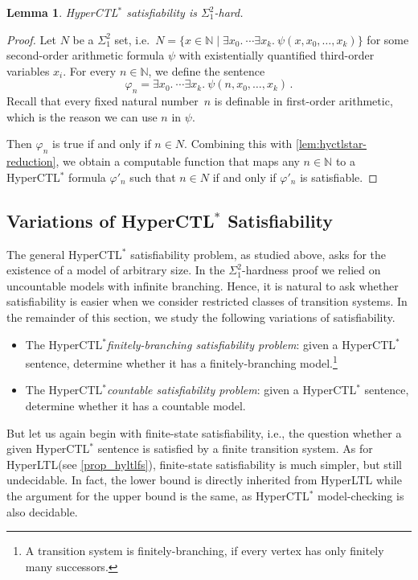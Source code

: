 \documentclass[dvipsnames,10pt,a4paper]{amsart}
\newtheorem{lem}[thm]{Lemma}
\theoremstyle{definition}
\theoremstyle{remark}
\newcommand{\set}[1]{\{#1\}}
\newcommand{\nats}{\mathbb{N}}
\renewcommand{\phi}{\varphi}
\newcommand\Nat{\nats}
\newcommand{\hyltl}{{HyperLTL}\xspace}
\newcommand{\hyctlstar}{{HyperCTL$^*$}\xspace}
\renewcommand{\phi}{\varphi}
\begin{document}
\begin{lem}
  \hyctlstar satisfiability is $\Sigma^2_1$-hard.
\end{lem}
\begin{proof}
  Let $N$ be a $\Sigma^2_1$ set, i.e.\
  $N = \set{x \in \nats \mid \exists x_0.\ \cdots \exists x_k.\ \psi(x, x_0, \ldots, x_k)}$ for some second-order arithmetic formula $\psi$ with existentially
  quantified third-order variables $x_i$.
  For every $n \in \Nat$, we define the sentence
  \[\varphi_n = \exists x_0.\ \cdots \exists x_k.\ \psi(n,x_0,\ldots,x_k)\, .\]
	Recall that every fixed natural number~$n$ is definable in first-order arithmetic, which is the reason we can use $n$ in $\psi$.
  
  Then $\varphi_n$ is true  if and only if  $n \in N$.
  Combining this with \autoref{lem:hyctlstar-reduction}, we obtain a
  computable function that maps any $n \in \Nat$ to a \hyctlstar formula
  $\phi'_n$ such that $n \in N$ if and only if $\phi'_n$ is satisfiable.
\end{proof}

\subsection{Variations of \texorpdfstring{\hyctlstar}{HyperCTL*} Satisfiability}

The general \hyctlstar satisfiability problem, as studied above, asks for the existence of a model of arbitrary size. 
In the $\Sigma^2_1$-hardness proof we relied on uncountable models with infinite branching. 
Hence, it is natural to ask whether satisfiability is easier when we consider restricted classes of transition systems.
In the remainder of this section, we study the following variations of satisfiability.

\begin{itemize}
\item The \hyctlstar \emph{finitely-branching satisfiability problem}: given a \hyctlstar sentence, determine whether it has a finitely-branching model.\footnote{A transition system is finitely-branching, if every vertex has only finitely many successors.}
\item The \hyctlstar \emph{countable satisfiability problem}: given a \hyctlstar sentence, determine whether it has a countable model.
\end{itemize}

But let us again begin with finite-state satisfiability, i.e., the question whether a given \hyctlstar sentence is satisfied by a finite transition system.
As for \hyltl (see \autoref{prop_hyltlfs}), finite-state satisfiability is much simpler, but still undecidable.
In fact, the lower bound is directly inherited from \hyltl while the argument for the upper bound is the same, as \hyctlstar model-checking is also decidable.
\end{document}
